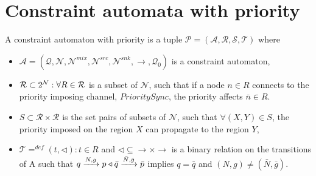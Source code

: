 \section{Constraint automata with priority}
\begin{definition}
  \label{def:pca}
 A constraint automaton with priority is a tuple $\mathcal{P} = (\mathcal{A}, \mathcal{R}, \mathcal{S}, \mathcal{T})$ where
 \begin{itemize}
  \item $\mathcal{A} = (\mathcal{Q}, \mathcal{N}, \mathcal{N}^{mix}, \mathcal{N}^{src}, \mathcal{N}^{snk}, \longrightarrow, \mathcal{Q}_{0})$ is a constraint automaton,
  \item $\mathcal{R} \subset 2^{\mathcal{N}}: \forall R \in \mathcal{R}$ is a subset of $\mathcal{N}$, such that if a node $n \in R$ connects to the priority imposing channel, $PrioritySync$, the priority affects $\bar{n} \in R$. 
  \item $S \subset \mathcal{R} \times \mathcal{R}$ is the set pairs of subsets of $\mathcal{N}$, such that $\forall (X, Y) \in S$, the priority imposed on the region $X$ can propagate to the region $Y$,
 \item $\mathcal{T}=^{def} (t, \triangleleft) : t \in R$ and $\triangleleft \subseteq \longrightarrow \times \longrightarrow$ is a binary relation on the transitions of A such that $q\xrightarrow{N,g}p \triangleleft \bar{q}\xrightarrow{\bar{N},\bar{g}}\bar{p}$ implies $q = \bar{q}$ and $(N, g) \neq (\bar{N}, \bar{g})$.
 \end{itemize}
\end{definition}

